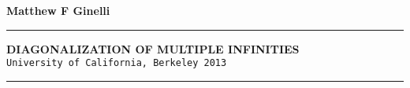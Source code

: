 \documentclass[a4paper,12pt]{article}
\newcommand{\titleline}[1]{\noindent\rule{\textwidth}{#1}}
\begin{document}
\thispagestyle{empty}

\vspace*{\fill}

\begin{center}

\textbf{Matthew F Ginelli}

\end{center}
\titleline{5pt}

\begin{center}
\bigskip
\textbf{DIAGONALIZATION OF MULTIPLE INFINITIES}\\
\smallskip
\texttt{University of California, Berkeley 2013}
\medskip
\end{center}

\titleline{5pt}
\vspace*{\fill}
\end{document}
